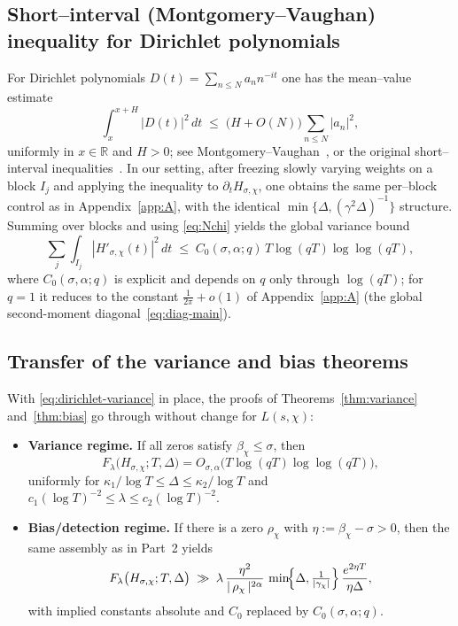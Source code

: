 \subsection*{Short–interval (Montgomery–Vaughan) inequality for Dirichlet polynomials}
For Dirichlet polynomials $D(t)=\sum_{n\le N} a_n n^{-it}$ one has the mean–value
estimate
\[
\int_{x}^{x+H}\!\!\bigl|D(t)\bigr|^2\,dt
\;\le\;
\bigl(H + O(N)\bigr)\sum_{n\le N}|a_n|^2,
\]
uniformly in $x\in\mathbb{R}$ and $H>0$; see Montgomery–Vaughan~\cite{mv-book}, or
the original short–interval inequalities~\cite{montgomery-vaughan}. In our setting, after freezing slowly varying
weights on a block $I_j$ and applying the inequality to $\partial_t H_{\sigma,\chi}$,
one obtains the same per–block control as in Appendix~\ref{app:A}, with the identical
$\min\{\Delta,(\gamma^2 \Delta)^{-1}\}$ structure. Summing over blocks and using
\eqref{eq:Nchi} yields the global variance bound
\begin{equation}
\sum_j \int_{I_j}\!|H'_{\sigma,\chi}(t)|^2\,dt
\;\le\;
C_0(\sigma,\alpha;q)\,T\log(qT)\log\log(qT),
\label{eq:dirichlet-variance}
\end{equation}
where $C_0(\sigma,\alpha;q)$ is explicit and depends on $q$ only through
$\log(qT)$; for $q=1$ it reduces to the constant $\tfrac{1}{2\pi}+o(1)$ of
Appendix~\ref{app:A} (the global second-moment diagonal~\eqref{eq:diag-main}).

\subsection*{Transfer of the variance and bias theorems}
With \eqref{eq:dirichlet-variance} in place, the proofs of Theorems~\ref{thm:variance}
and~\ref{thm:bias} go through without change for $L(s,\chi)$:
\begin{itemize}
\item \textbf{Variance regime.} If all zeros satisfy $\beta_\chi\le \sigma$, then
\[
F_\lambda\bigl(H_{\sigma,\chi};T,\Delta\bigr)
=O_{\sigma,\alpha}\!\bigl(T\log(qT)\log\log(qT)\bigr),
\]
uniformly for $\kappa_1/\log T\le \Delta\le \kappa_2/\log T$ and
$c_1(\log T)^{-2}\le \lambda\le c_2(\log T)^{-2}$.
\item \textbf{Bias/detection regime.} If there is a zero $\rho_\chi$ with
$\eta:=\beta_\chi-\sigma>0$, then the same assembly as in Part~2 yields
\[
F_\lambda\bigl(H_{\sigma,\chi};T,\Delta\bigr)
\;\gg\;
\lambda\,
\frac{\eta^{2}}{|\,\rho_\chi\,|^{2\alpha}}\,
\min\!\Bigl\{\Delta,\tfrac{1}{|\gamma_\chi|}\Bigr\}\,
\frac{e^{2\eta T}}{\eta\Delta},
\]
with implied constants absolute and $C_0$ replaced by $C_0(\sigma,\alpha;q)$.
\end{itemize}

